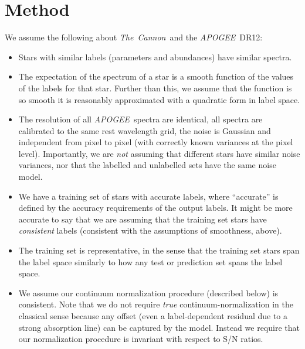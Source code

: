 \documentclass[12pt,preprint]{aastex}
\newcommand{\project}[1]{\textsl{#1}}
\newcommand{\TheCannon}{\project{The~Cannon}}
\newcommand{\acronym}[1]{{\small{#1}}}
\newcommand{\apogee}{\project{\acronym{APOGEE}}}
\newcommand{\dr}{\acronym{DR12}}
\begin{document}
\section{Method}

\noindent{}We assume the following about \TheCannon\ and the \apogee\ \dr:
\begin{itemize}
\item
Stars with similar labels (parameters and abundances) have similar spectra.
\item
The expectation of the spectrum of a star is a smooth function of the values of 
the labels for that star.  Further than this, we assume that the function is so 
smooth it is reasonably approximated with a quadratic form in label space.
\item
The resolution of all \apogee\ spectra are identical, all spectra are calibrated
to the same rest wavelength grid, the noise is Gaussian and independent from 
pixel to pixel (with correctly known variances at the pixel level).  
Importantly, we are \emph{not} assuming that different stars have similar noise
variances, nor that the labelled and unlabelled sets have the same noise model.
\item
We have a training set of stars with accurate labels, where ``accurate'' is 
defined by the accuracy requirements of the output labels.  It might be more 
accurate to say that we are assuming that the training set stars have 
\emph{consistent} labels (consistent with the assumptions of smoothness, above).
\item
The training set is representative, in the sense that the training set stars 
span the label space similarly to how any test or prediction set spans the label
space.
\item
We assume our continuum normalization procedure (described below) is consistent.
Note that we do not require \emph{true} continuum-normalization in the classical
sense because any offset (even a label-dependent residual due to a strong 
absorption line) can be captured by the model.  Instead we require that our 
normalization procedure is invariant with respect to S/N ratios.
\end{itemize}
\end{document}
